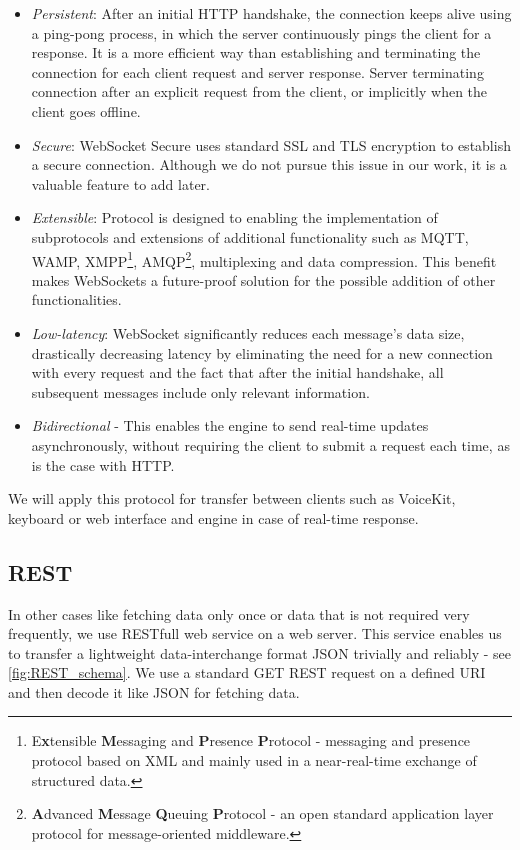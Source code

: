 \begin{itemize}
	\item \textit{Persistent}: After an initial HTTP handshake, the connection keeps alive using a ping-pong process, in which the server continuously pings the client for a response. It is a more efficient way than establishing and terminating the connection for each client request and server response. Server terminating connection after an explicit request from the client, or implicitly when the client goes offline.
	\item \textit{Secure}: WebSocket Secure uses standard SSL and TLS encryption to establish a secure connection. Although we do not pursue this issue in our work, it is a valuable feature to add later.
	\item \textit{Extensible}: Protocol is designed to enabling the implementation of subprotocols and extensions of additional functionality such as MQTT, WAMP, XMPP\footnote{E\textbf{x}tensible \textbf{M}essaging and \textbf{P}resence \textbf{P}rotocol - messaging and presence protocol based on XML and mainly used in a near-real-time exchange of structured data.}, AMQP\footnote{\textbf{A}dvanced \textbf{M}essage \textbf{Q}ueuing \textbf{P}rotocol - an open standard application layer protocol for message-oriented middleware.}, multiplexing and data compression. This benefit makes WebSockets a future-proof solution for the possible addition of other functionalities.
	\item \textit{Low-latency}: WebSocket significantly reduces each message's data size, drastically decreasing latency by eliminating the need for a new connection with every request and the fact that after the initial handshake, all subsequent messages include only relevant information.
	\item \textit{Bidirectional} - This enables the engine to send real-time updates asynchronously, without requiring the client to submit a request each time, as is the case with HTTP. 
\end{itemize}

We will apply this protocol for transfer between clients such as VoiceKit, keyboard or web interface and engine in case of real-time response.

\subsection{REST}

In other cases like fetching data only once or data that is not required very frequently, we use RESTfull web service on a web server. This service enables us to transfer a lightweight data-interchange format JSON trivially and reliably - see \cref{fig:REST_schema}. We use a standard GET REST request on a defined URI and then decode it like JSON for fetching data.

